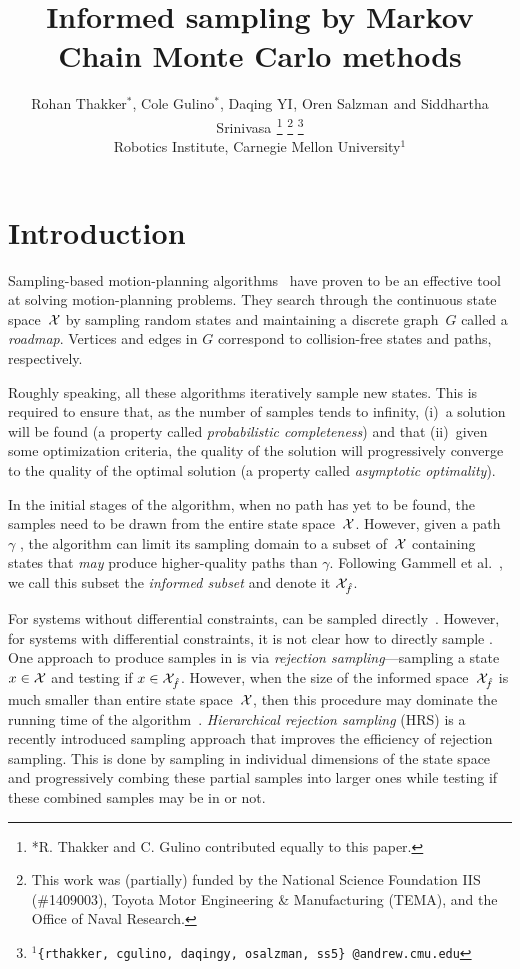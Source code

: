 \documentclass[letterpaper, 10 pt, conference]{ieeeconf}  %
\title{\LARGE \bf
Informed sampling by Markov Chain Monte Carlo methods
}
\author{
Rohan Thakker$^{*}$,
Cole Gulino$^{*}$,
Daqing YI$^{}$,
Oren Salzman$^{}$ and
Siddhartha Srinivasa$^{}$%
\thanks{*R. Thakker and C. Gulino contributed equally to this paper.}
\thanks{This work was (partially) funded by the National Science Foundation IIS (\#1409003), Toyota Motor Engineering \& Manufacturing (TEMA), and the Office of Naval Research.}%
\thanks{$^{1}${\tt\small \{rthakker, cgulino, daqingy, osalzman, ss5\} @andrew.cmu.edu}}%
%
\\        
Robotics Institute, Carnegie Mellon University$^{1}$
}
\begin{document}
\maketitle
\thispagestyle{empty}
\pagestyle{empty}


\begin{abstract}

\end{abstract}


\section{Introduction}
\label{sec:intro}

Sampling-based motion-planning algorithms~\cite{CBHKKLT05, L06} have proven to be an effective tool at solving motion-planning problems.
They search through the continuous state space~$\mathcal{X}$ by sampling random states and maintaining a discrete graph~$G$ called a \emph{roadmap}.
Vertices and edges in $G$ correspond to collision-free states and paths, respectively.

Roughly speaking, all these algorithms iteratively sample new states.
This is required to ensure that, as the number of samples tends to infinity, 
(i)~a solution will be found 
(a property called \emph{probabilistic completeness})
and that
(ii)~given some optimization criteria, the quality of the solution will progressively converge to the quality of the optimal solution
(a property called \emph{asymptotic  optimality}).

In the initial stages of the algorithm, 
when no path has yet to be found, 
the samples need to be drawn from the entire state space~$\mathcal{X}$.
However, given a path $\gamma$ , the algorithm can limit its sampling domain to a subset of~$\mathcal{X}$  containing states that \emph{may} produce higher-quality paths than $\gamma$.
Following Gammell et al.~\cite{GSB14}, we call this subset the \emph{informed subset} and denote it $\mathcal{X}_{\hat{f}}$.

For systems without differential constraints, \Cinf can be sampled directly~\cite{GSB14}.
However, for systems with differential constraints, it is not clear how to directly sample \Cinf.
One approach to produce samples in \Cinf is via \emph{rejection sampling}---sampling a state $x \in \mathcal{X}$ and testing if $x \in \mathcal{X}_{\hat{f}}$.
However, when the size of the informed space~$\mathcal{X}_{\hat{f}}$ is much smaller than entire state space~$\mathcal{X}$, then this procedure may dominate the running time of the algorithm~\cite{KTC16}.
\emph{Hierarchical rejection sampling} (HRS) is a recently introduced sampling approach that improves the efficiency of rejection sampling.
This is done by sampling in individual dimensions of the state space and progressively combing these partial samples into larger ones while testing if these combined samples may be in \Cinf or not.
\end{document}
